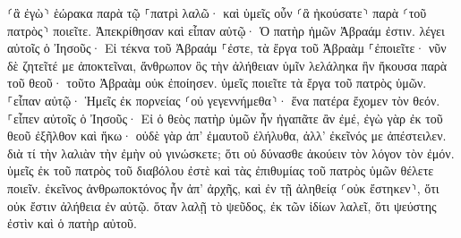 \documentclass{openreader}
\begin{document}
⸂ἃ ἐγὼ⸃ ἑώρακα παρὰ τῷ ⸀πατρὶ λαλῶ· καὶ ὑμεῖς οὖν ⸂ἃ ἠκούσατε⸃ παρὰ ⸂τοῦ πατρὸς⸃ ποιεῖτε. 
Ἀπεκρίθησαν καὶ εἶπαν αὐτῷ· Ὁ πατὴρ ἡμῶν Ἀβραάμ ἐστιν. λέγει αὐτοῖς ὁ Ἰησοῦς· Εἰ τέκνα τοῦ Ἀβραάμ ⸀ἐστε, τὰ ἔργα τοῦ Ἀβραὰμ ⸀ἐποιεῖτε· 
νῦν δὲ ζητεῖτέ με ἀποκτεῖναι, ἄνθρωπον ὃς τὴν ἀλήθειαν ὑμῖν λελάληκα ἣν ἤκουσα παρὰ τοῦ θεοῦ· τοῦτο Ἀβραὰμ οὐκ ἐποίησεν. 
ὑμεῖς ποιεῖτε τὰ ἔργα τοῦ πατρὸς ὑμῶν. ⸀εἶπαν αὐτῷ· Ἡμεῖς ἐκ πορνείας ⸂οὐ γεγεννήμεθα⸃· ἕνα πατέρα ἔχομεν τὸν θεόν. 
⸀εἶπεν αὐτοῖς ὁ Ἰησοῦς· Εἰ ὁ θεὸς πατὴρ ὑμῶν ἦν ἠγαπᾶτε ἂν ἐμέ, ἐγὼ γὰρ ἐκ τοῦ θεοῦ ἐξῆλθον καὶ ἥκω· οὐδὲ γὰρ ἀπ’ ἐμαυτοῦ ἐλήλυθα, ἀλλ’ ἐκεῖνός με ἀπέστειλεν. 
διὰ τί τὴν λαλιὰν τὴν ἐμὴν οὐ γινώσκετε; ὅτι οὐ δύνασθε ἀκούειν τὸν λόγον τὸν ἐμόν. 
ὑμεῖς ἐκ τοῦ πατρὸς τοῦ διαβόλου ἐστὲ καὶ τὰς ἐπιθυμίας τοῦ πατρὸς ὑμῶν θέλετε ποιεῖν. ἐκεῖνος ἀνθρωποκτόνος ἦν ἀπ’ ἀρχῆς, καὶ ἐν τῇ ἀληθείᾳ ⸂οὐκ ἔστηκεν⸃, ὅτι οὐκ ἔστιν ἀλήθεια ἐν αὐτῷ. ὅταν λαλῇ τὸ ψεῦδος, ἐκ τῶν ἰδίων λαλεῖ, ὅτι ψεύστης ἐστὶν καὶ ὁ πατὴρ αὐτοῦ. 
\end{document}
